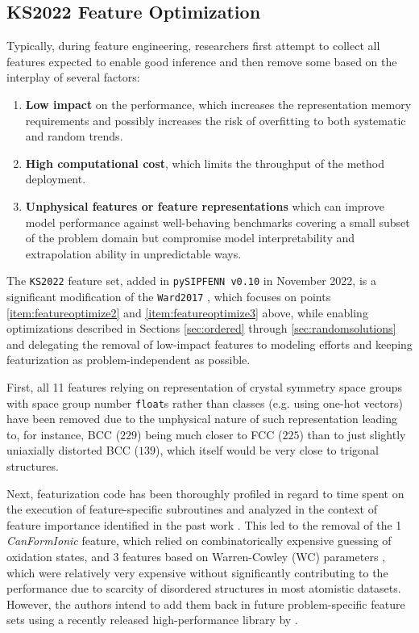 \subsection{KS2022 Feature Optimization} \label{ssec:ks2022features}

Typically, during feature engineering, researchers first attempt to collect all features expected to enable good inference and then remove some based on the interplay of several factors:
\begin{enumerate}
    \item \textbf{Low impact} on the performance, which increases the representation memory requirements and possibly increases the risk of overfitting to both systematic and random trends. 
    \label{item:featureoptimize1}
    \item \textbf{High computational cost}, which limits the throughput of the method deployment.
    \label{item:featureoptimize2}
    \item \textbf{Unphysical features or feature representations} which can improve model performance against well-behaving benchmarks covering a small subset of the problem domain but compromise model interpretability and extrapolation ability in unpredictable ways.
    \label{item:featureoptimize3}
\end{enumerate}

The \texttt{KS2022} feature set, added in \texttt{pySIPFENN v0.10} in November 2022, is a significant modification of the \texttt{Ward2017} \cite{Ward2017}, which focuses on points \ref{item:featureoptimize2} and \ref{item:featureoptimize3} above, while enabling optimizations described in Sections \ref{sec:ordered} through \ref{sec:randomsolutions} and delegating the removal of low-impact features to modeling efforts and keeping featurization as problem-independent as possible.

First, all 11 features relying on representation of crystal symmetry space groups with space group number \texttt{float}s rather than classes (e.g. using one-hot vectors) have been removed due to the unphysical nature of such representation leading to, for instance, BCC ($229$) being much closer to FCC ($225$) than to just slightly uniaxially distorted BCC ($139$), which itself would be very close to trigonal structures. 

Next, featurization code has been thoroughly profiled in regard to time spent on the execution of feature-specific subroutines and analyzed in the context of feature importance identified in the past work \cite{Krajewski2022ExtensibleNetworks}. This led to the removal of the 1 \textit{CanFormIonic} feature, which relied on combinatorically expensive guessing of oxidation states, and 3 features based on Warren-Cowley (WC) parameters \cite{Cowley1950AnAlloys}, which were relatively very expensive without significantly contributing to the performance due to scarcity of disordered structures in most atomistic datasets. However, the authors intend to add them back in future problem-specific feature sets using a recently released high-performance library by \citet{Gehringer2023ModelsSimple}. 

